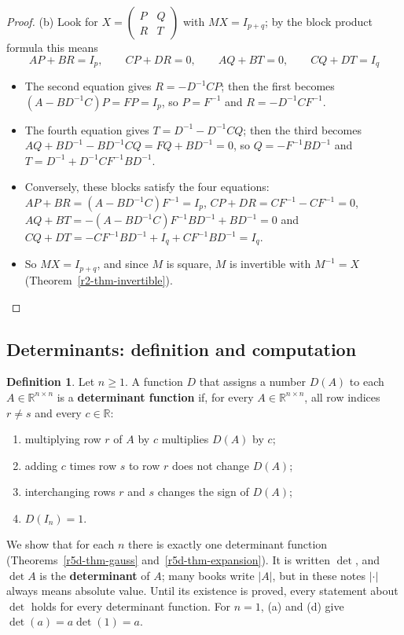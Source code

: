 \documentclass[12pt]{article}
\newcommand{\R}{\mathbb R}
\theoremstyle{definition}
\newtheorem{definition}[theorem]{Definition}
\begin{document}
\begin{proof}
(b) Look for \(X=\left(\begin{smallmatrix}P&Q\\R&T\end{smallmatrix}\right)\) with
\(MX=I_{p+q}\); by the block product formula this means
\[
AP+BR=I_p,\qquad CP+DR=0,\qquad AQ+BT=0,\qquad CQ+DT=I_q
\]
\begin{itemize}
\item The second equation gives \(R=-D^{-1}CP\); then the first becomes
\((A-BD^{-1}C)P=FP=I_p\), so \(P=F^{-1}\) and \(R=-D^{-1}CF^{-1}\).
\item The fourth equation gives \(T=D^{-1}-D^{-1}CQ\); then the third becomes
\(AQ+BD^{-1}-BD^{-1}CQ=FQ+BD^{-1}=0\), so \(Q=-F^{-1}BD^{-1}\) and
\(T=D^{-1}+D^{-1}CF^{-1}BD^{-1}\).
\item Conversely, these blocks satisfy the four equations:
\(AP+BR=(A-BD^{-1}C)F^{-1}=I_p\), \(CP+DR=CF^{-1}-CF^{-1}=0\),
\(AQ+BT=-(A-BD^{-1}C)F^{-1}BD^{-1}+BD^{-1}=0\) and
\(CQ+DT=-CF^{-1}BD^{-1}+I_q+CF^{-1}BD^{-1}=I_q\).
\item So \(MX=I_{p+q}\), and since \(M\) is square, \(M\) is invertible with \(M^{-1}=X\)
(Theorem~\ref{r2-thm-invertible}).\qedhere
\end{itemize}
\end{proof}

\subsection*{Determinants: definition and computation}

\begin{definition}\label{r5d-def-det}
Let \(n\geqslant1\). A function \(D\) that assigns a number \(D(A)\) to each \(A\in\R^{n\times n}\) is a
\textbf{determinant function} if, for every \(A\in\R^{n\times n}\), all row indices \(r\ne s\) and every
\(c\in\R\):
\begin{enumerate}
\item multiplying row \(r\) of \(A\) by \(c\) multiplies \(D(A)\) by \(c\);
\item adding \(c\) times row \(s\) to row \(r\) does not change \(D(A)\);
\item interchanging rows \(r\) and \(s\) changes the sign of \(D(A)\);
\item \(D(I_n)=1\).
\end{enumerate}
We show that for each \(n\) there is exactly one determinant function
(Theorems~\ref{r5d-thm-gauss} and~\ref{r5d-thm-expansion}). It is written \(\det\), and \(\det A\) is the
\textbf{determinant} of \(A\); many books write \(\lvert A\rvert\), but in these notes \(\lvert\cdot\rvert\) always
means absolute value. Until its existence is proved, every statement
about \(\det\) holds for every determinant function. For \(n=1\), (a) and (d) give \(\det(a)=a\det(1)=a\).
\end{definition}
\end{document}
